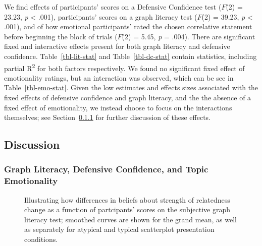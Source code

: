 \documentclass[manuscript,screen,review]{acmart}
\begin{document}
We find effects of participants' scores on a Defensive Confidence test
(\(F\)(2) = 23.23, \emph{p} \textless{} .001), participants' scores on a
graph literacy test \citep{garcia_2016} (\(F\)(2) = 39.23, \emph{p}
\textless{} .001), and of how emotional participants' rated the chosen
correlative statement before beginning the block of trials (\(F\)(2) =
5.45, \emph{p} = .004). There are significant fixed and interactive
effects present for both graph literacy and defensive confidence.
Table~\ref{tbl-lit-stat} and Table~\ref{tbl-dc-stat} contain statistics,
including partial R\textsuperscript{2} for both factors respectively. We
found no significant fixed effect of emotionality ratings, but an
interaction was observed, which can be see in Table~\ref{tbl-emo-stat}.
Given the low estimates and effects sizes associated with the fixed
effects of defensive confidence and graph literacy, and the the absence
of a fixed effect of emotionality, we instead choose to focus on the
interactions themselves; see Section~\ref{sec-add-analyses} for further
discussion of these effects.

\subsection{Discussion}\label{discussion}

\subsubsection{Graph Literacy, Defensive Confidence, and Topic
Emotionality}\label{sec-add-analyses}

\begin{figure}


\caption{\label{fig-lit-smooth}Illustrating how differences in beliefs
about strength of relatedness change as a function of partcipants'
scores on the subjective graph literacy test; smoothed curves are shown
for the grand mean, as well as separately for atypical and typical
scatterplot presentation conditions.}

\end{figure}%
\end{document}
